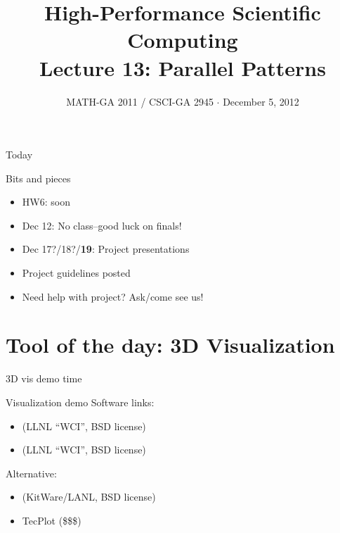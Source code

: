 \documentclass[english,compress]{beamer}
\begin{document}

\title{High-Performance Scientific Computing\\Lecture 13: Parallel
Patterns}

\date{MATH-GA 2011 / CSCI-GA 2945 $\cdot$ December 5, 2012}

\frame{\titlepage}

\begin{frame}{Today}
  \tableofcontents[hideallsubsections]
\end{frame}
\begin{frame}{Bits and pieces}
  \begin{itemize}
    \item HW6: soon
    \item Dec 12: No class--good luck on finals!
    \item Dec 17?/18?/\textbf{19}: Project presentations
    \item Project guidelines posted
    \item Need help with project? Ask/come see us!
  \end{itemize}
\end{frame}

\section[Visualization]{Tool of the day: 3D Visualization}
\begin{frame}
  \begin{center}
  \Huge 3D vis demo time
  \end{center}
\end{frame}
\begin{frame}{Visualization demo}
  Software links:
  \begin{itemize}
    \item {} (LLNL ``WCI'', BSD license)
    \item {} (LLNL ``WCI'', BSD license)
  \end{itemize}
  Alternative:
  \begin{itemize}
    \item {} (KitWare/LANL, BSD
      license)
    \item TecPlot (\$\$\$)
  \end{itemize}
\end{frame}
\end{document}
